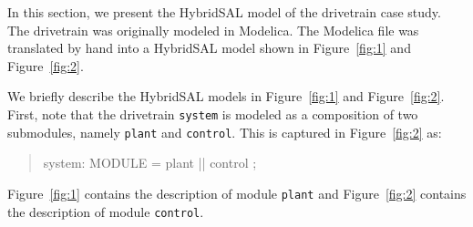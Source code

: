 \documentclass{llncs}
\begin{document}
In this section, we present the HybridSAL model of the drivetrain case study.
The drivetrain was originally modeled in Modelica. 
The Modelica file was translated by hand into a HybridSAL model
shown in Figure~\ref{fig:1} and Figure~\ref{fig:2}.

We briefly describe the
HybridSAL models in Figure~\ref{fig:1} and Figure~\ref{fig:2}.
First, note that the drivetrain {\tt{system}} is modeled as a composition
of two submodules, namely {\tt{plant}} and {\tt{control}}.
This is captured in Figure~\ref{fig:2} as:
\begin{quote}
\begin{tt}
system: MODULE  = plant || control ;
\end{tt}
\end{quote}
Figure~\ref{fig:1} contains the description of module {\tt{plant}}
and 
Figure~\ref{fig:2} contains the description of module {\tt{control}}.
\end{document}
